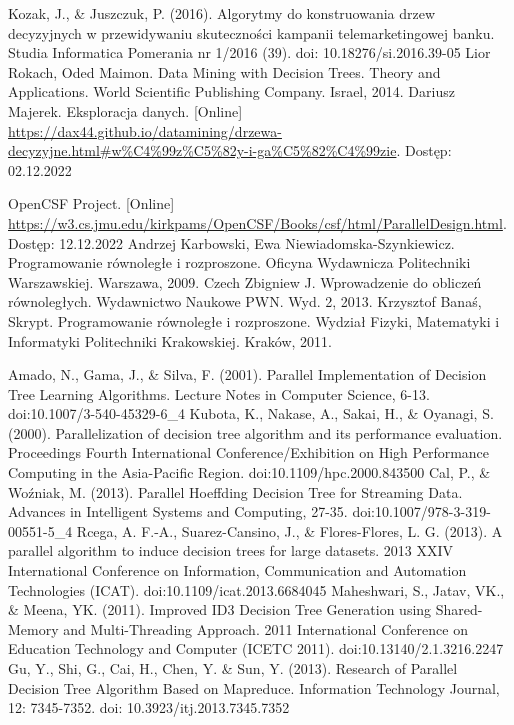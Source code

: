 \documentclass[12pt]{article}
\begin{document}
\begin{thebibliography}{20}

     Kozak, J., \& Juszczuk, P. (2016). Algorytmy do konstruowania drzew decyzyjnych w przewidywaniu skuteczności kampanii telemarketingowej banku. Studia Informatica Pomerania nr 1/2016 (39). doi: 10.18276/si.2016.39-05
     Lior Rokach, Oded Maimon. Data Mining with Decision Trees. Theory and Applications. World Scientific Publishing Company. Israel, 2014.
     Dariusz Majerek. Eksploracja danych. [Online] \url{https://dax44.github.io/datamining/drzewa-decyzyjne.html#w%C4%99z%C5%82y-i-ga%C5%82%C4%99zie}. Dostęp: 02.12.2022
   
     OpenCSF Project. [Online] \url{https://w3.cs.jmu.edu/kirkpams/OpenCSF/Books/csf/html/ParallelDesign.html}. Dostęp: 12.12.2022
     Andrzej Karbowski, Ewa Niewiadomska-Szynkiewicz. Programowanie równoległe i rozproszone. Oficyna Wydawnicza Politechniki Warszawskiej. Warszawa, 2009.
     Czech Zbigniew J. Wprowadzenie do obliczeń równoległych. Wydawnictwo Naukowe PWN. Wyd. 2, 2013.
     Krzysztof Banaś, Skrypt. Programowanie równoległe i rozproszone. Wydział Fizyki, Matematyki i Informatyki Politechniki Krakowskiej. Kraków, 2011.

     Amado, N., Gama, J., \& Silva, F. (2001). Parallel Implementation of Decision Tree Learning Algorithms. Lecture Notes in Computer Science, 6-13. doi:10.1007/3-540-45329-6\_4 
     Kubota, K., Nakase, A., Sakai, H., \& Oyanagi, S. (2000). Parallelization of decision tree algorithm and its performance evaluation. Proceedings Fourth International Conference/Exhibition on High Performance Computing in the Asia-Pacific Region. doi:10.1109/hpc.2000.843500
     Cal, P., \& Woźniak, M. (2013). Parallel Hoeffding Decision Tree for Streaming Data. Advances in Intelligent Systems and Computing, 27-35. doi:10.1007/978-3-319-00551-5\_4
     Rcega, A. F.-A., Suarez-Cansino, J., \& Flores-Flores, L. G. (2013). A parallel algorithm to induce decision trees for large datasets. 2013 XXIV International Conference on Information, Communication and Automation Technologies (ICAT). doi:10.1109/icat.2013.6684045 
     Maheshwari, S., Jatav, VK., \& Meena, YK. (2011). Improved ID3 Decision Tree Generation using Shared-Memory and Multi-Threading Approach. 2011 International Conference on Education Technology and Computer (ICETC 2011). doi:10.13140/2.1.3216.2247
     Gu, Y., Shi, G., Cai, H., Chen, Y. \& Sun, Y. (2013). Research of Parallel Decision Tree Algorithm Based on Mapreduce. Information Technology Journal, 12: 7345-7352. doi: 10.3923/itj.2013.7345.7352

\end{thebibliography}
\end{document}

